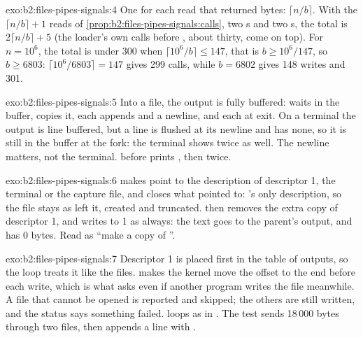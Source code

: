 \begin{solution}{exo:b2:files-pipes-signals:4}
One  for each read that returned bytes: $\lceil n / b \rceil$. With the $\lceil n/b \rceil + 1$ reads of
\cref{prop:b2:files-pipes-signals:calls}, two s and two s, the total is
$2\lceil n/b \rceil + 5$ (the loader's own calls before , about thirty, come on top). For $n = 10^6$, the
total is under 300 when $\lceil 10^6 / b \rceil \le 147$, that is $b \ge 10^6 / 147$, so $b \ge 6803$:
$\lceil 10^6 / 6803 \rceil = 147$ gives 299 calls, while $b = 6802$ gives 148 writes and 301.
\end{solution}

\begin{solution}{exo:b2:files-pipes-signals:5}
Into a file, the output is fully buffered:  waits in the buffer,  copies it, each  appends
 and a newline, and each   at exit. On a terminal the output is line buffered, but a line is
flushed at its newline and  has none, so it is still in the buffer at the fork: the terminal shows 
twice as well. The newline matters, not the terminal.  before  prints ,
then  twice.
\end{solution}

\begin{solution}{exo:b2:files-pipes-signals:6}
 makes  point to the description of descriptor 1, the terminal or the capture file, and
closes what  pointed to: 's only description, so the file stays as  left it,
created and truncated.  then removes the extra copy of descriptor 1, and  writes to 1 as
always: the text goes to the parent's output, and  has 0 bytes. Read  as ``make
 a copy of ''.
\end{solution}

\begin{solution}{exo:b2:files-pipes-signals:7}
Descriptor 1 is placed first in the table of outputs, so the loop treats it like the files.  makes the
kernel move the offset to the end before each write, which is what  asks even if another program writes the
file meanwhile. A file that cannot be opened is reported and skipped; the others are still written, and the status
says something failed.  loops as in . The test sends 18\,000 bytes through two files,
then appends a line with .
\end{solution}

